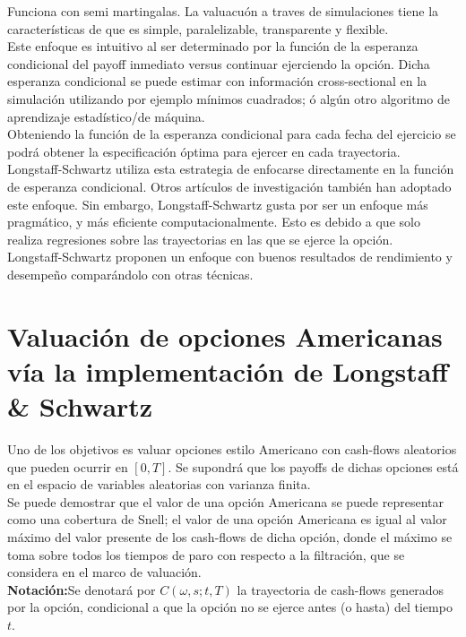\documentclass[11pt]{article}
\begin{document}
Funciona con semi martingalas. La valuacuón a traves de simulaciones tiene la características de que es simple, paralelizable,  transparente y flexible.\\  

Este enfoque es intuitivo al ser determinado por la función de la esperanza condicional del payoff inmediato versus continuar ejerciendo la opción. 
Dicha esperanza condicional se puede estimar con información cross-sectional en la simulación utilizando por ejemplo mínimos cuadrados; ó algún otro algoritmo de aprendizaje estadístico/de máquina.\\

Obteniendo la función de la esperanza condicional para cada fecha del ejercicio se podrá obtener la especificación óptima para ejercer en cada trayectoria.\\
		
Longstaff-Schwartz utiliza esta estrategia de enfocarse directamente en la función 
de esperanza condicional. Otros artículos de investigación también han adoptado 
este enfoque. Sin embargo, Longstaff-Schwartz gusta por ser un enfoque más  pragmático, y más eficiente computacionalmente. Esto es debido a que solo 
realiza regresiones sobre las trayectorias en las que se ejerce la opción.\\

Longstaff-Schwartz proponen un enfoque con buenos resultados de rendimiento y desempeño comparándolo con otras técnicas.

\section{Valuación de opciones Americanas vía la implementación de Longstaff \& Schwartz}
	
Uno de los objetivos es valuar opciones estilo Americano con cash-flows  aleatorios que pueden ocurrir en $[0,T]$. Se supondrá que los payoffs de dichas  opciones está en el espacio de variables aleatorias con varianza finita.\\
	
Se puede demostrar que el valor de una opción Americana se puede representar como una cobertura de Snell; el valor de una opción Americana es igual al valor  máximo del valor presente de los cash-flows de dicha opción, donde el máximo  se toma sobre todos los tiempos de paro con respecto a la filtración, que se 
considera en el marco de valuación.\\
	
\textbf{Notación:}Se denotará por $C(\omega, s; t,T)$ la trayectoria de cash-flows generados por la opción, condicional a que la opción no se ejerce antes (o hasta) del tiempo $t$.\\
	
\end{document}
